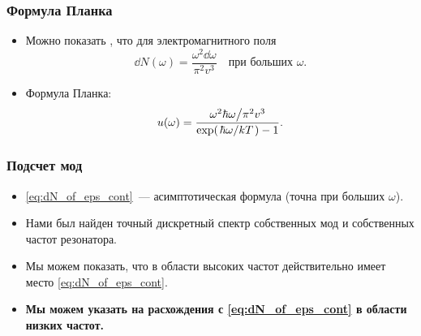 \documentclass[compress]{beamer}
\begin{document}
    \begin{frame}\frametitle{Формула Планка}

        \begin{itemize}

            \item Можно показать \cite{sivuhin_opt}, что для электромагнитного поля
            \begin{equation}\label{eq:dN_of_eps_cont}
                \dd{N(\omega)} = \frac{\omega^2 \dd{\omega}}{\pi^2 v^3} \quad
                    \text{при больших $\omega$}.
            \end{equation}

            \item Формула Планка:
            \begin{equation}
                u(\omega) = \frac{
                        \flatfrac{\omega^2 \hbar\omega}{\pi^2 v^3}
                }{\exp(\flatfrac{\hbar\omega}{kT}) - 1} .
            \end{equation}

        \end{itemize}

    \end{frame}


    \begin{frame}\frametitle{Подсчет мод}

        \begin{itemize}

            \item \autoref{eq:dN_of_eps_cont}~--- асимптотическая формула (точна при больших $\omega$).

            \item Нами был найден точный дискретный спектр собственных мод и собственных частот резонатора.

            \item Мы можем показать, что в области высоких частот действительно имеет место \autoref{eq:dN_of_eps_cont}.

            \item \textbf{Мы можем указать на расхождения с \autoref{eq:dN_of_eps_cont} в области низких частот.}

        \end{itemize}

    \end{frame}
\end{document}
